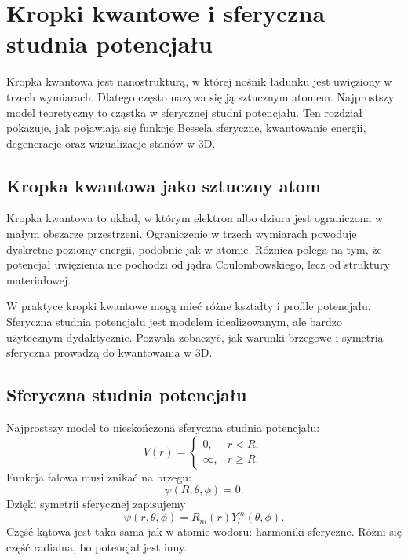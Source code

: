 \chapter{Kropki kwantowe i sferyczna studnia potencjału}

\begin{summarybox}
Kropka kwantowa jest nanostrukturą, w której nośnik ładunku jest uwięziony w
trzech wymiarach. Dlatego często nazywa się ją sztucznym atomem. Najprostszy
model teoretyczny to cząstka w sferycznej studni potencjału. Ten rozdział
pokazuje, jak pojawiają się funkcje Bessela sferyczne, kwantowanie energii,
degeneracje oraz wizualizacje stanów w 3D.
\end{summarybox}

\section{Kropka kwantowa jako sztuczny atom}

Kropka kwantowa to układ, w którym elektron albo dziura jest ograniczona w małym obszarze przestrzeni. Ograniczenie w trzech wymiarach powoduje dyskretne poziomy energii, podobnie jak w atomie. Różnica polega na tym, że potencjał uwięzienia nie pochodzi od jądra Coulombowskiego, lecz od struktury materiałowej.

W praktyce kropki kwantowe mogą mieć różne kształty i profile potencjału. Sferyczna studnia potencjału jest modelem idealizowanym, ale bardzo użytecznym dydaktycznie. Pozwala zobaczyć, jak warunki brzegowe i symetria sferyczna prowadzą do kwantowania w 3D.

\section{Sferyczna studnia potencjału}

Najprostszy model to nieskończona sferyczna studnia potencjału:
\begin{equation}
    V(r)=
    \begin{cases}
    0, & r<R,\\
    \infty, & r\geq R.
    \end{cases}
\end{equation}
Funkcja falowa musi znikać na brzegu:
\begin{equation}
    \psi(R,\theta,\phi)=0.
\end{equation}
Dzięki symetrii sferycznej zapisujemy
\begin{equation}
    \psi(r,\theta,\phi)=R_{nl}(r)Y_l^m(\theta,\phi).
\end{equation}
Część kątowa jest taka sama jak w atomie wodoru: harmoniki sferyczne. Różni się część radialna, bo potencjał jest inny.

